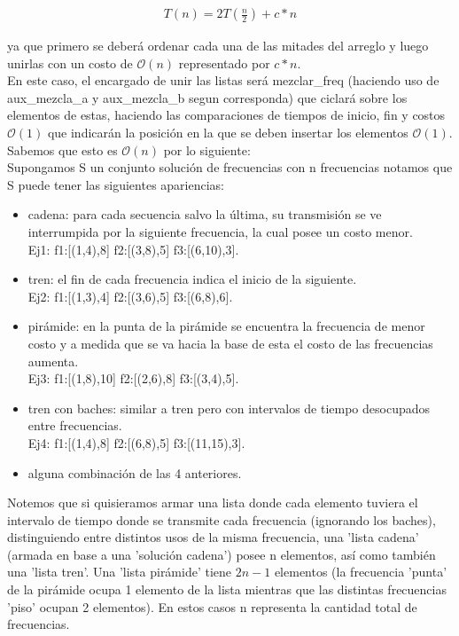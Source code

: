 \begin{equation*}
\begin{array}{l}
T(n) = 2T(\frac{n}{2}) + c*n
\end{array}
\end{equation*}

ya que primero se deberá ordenar cada una de las mitades del arreglo y luego unirlas con un costo de $\mathcal{O}(n)$ representado por $c*n$.\\
En este caso, el encargado de unir las listas será mezclar_freq (haciendo uso de aux_mezcla_a y aux_mezcla_b segun corresponda) que ciclará sobre los elementos de estas, haciendo las comparaciones de tiempos de inicio, fin y costos $\mathcal{O}(1)$ que indicarán la posición en la que se deben insertar los elementos $\mathcal{O}(1)$. \\
Sabemos que esto es $\mathcal{O}(n)$ por lo siguiente:\\
Supongamos S un conjunto solución de frecuencias con n frecuencias notamos que S puede tener las siguientes apariencias:
\begin{itemize}
\item cadena: para cada secuencia salvo la última, su transmisión se ve interrumpida por la siguiente frecuencia, la cual posee un costo menor.\\ 
Ej1: f1:[(1,4),8] f2:[(3,8),5] f3:[(6,10),3].
\item tren: el fin de cada frecuencia indica el inicio de la siguiente.\\
 Ej2: f1:[(1,3),4] f2:[(3,6),5] f3:[(6,8),6].
\item pirámide: en la punta de la pirámide se encuentra la frecuencia de menor costo y a medida que se va hacia la base de esta el costo de las frecuencias aumenta.\\
 Ej3: f1:[(1,8),10] f2:[(2,6),8] f3:[(3,4),5].
\item tren con baches: similar a tren pero con intervalos de tiempo desocupados entre frecuencias.\\
Ej4: f1:[(1,4),8] f2:[(6,8),5] f3:[(11,15),3].
\item alguna combinación de las 4 anteriores.
\end{itemize}
Notemos que si quisieramos armar una lista donde cada elemento tuviera el intervalo de tiempo donde se transmite cada frecuencia (ignorando los baches), distinguiendo entre distintos usos de la misma frecuencia, una 'lista cadena' (armada en base a una 'solución cadena') posee n elementos, así como también una 'lista tren'. Una 'lista pirámide' tiene $2n-1$ elementos (la frecuencia 'punta' de la pirámide ocupa 1 elemento de la lista mientras que las distintas frecuencias 'piso' ocupan 2 elementos). En estos casos n representa la cantidad total de frecuencias.\\
